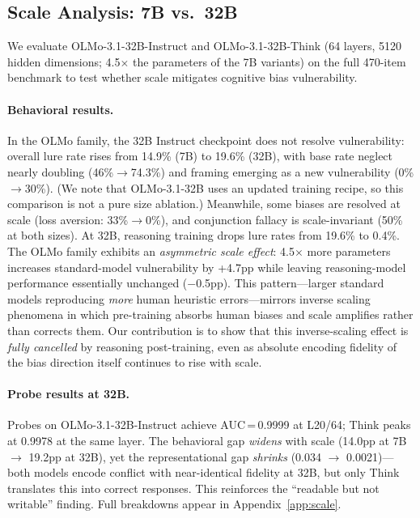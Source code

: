 \documentclass{article}
\begin{document}
\subsection{Scale Analysis: 7B vs.\ 32B}
\label{sec:scale}

We evaluate OLMo-3.1-32B-Instruct and OLMo-3.1-32B-Think
(64 layers, 5120 hidden dimensions; 4.5$\times$ the parameters of the
7B variants) on the full 470-item benchmark to test whether scale
mitigates cognitive bias vulnerability.

\paragraph{Behavioral results.}
In the OLMo family, the 32B Instruct checkpoint does not resolve vulnerability: overall lure rate rises from 14.9\% (7B) to 19.6\% (32B), with base rate neglect nearly doubling (46\%$\to$74.3\%) and framing emerging as a new vulnerability (0\%$\to$30\%).  (We note that OLMo-3.1-32B uses an updated training recipe, so this comparison is not a pure size ablation.)  Meanwhile, some biases are resolved at scale (loss aversion: 33\%$\to$0\%), and conjunction fallacy is scale-invariant (50\% at both sizes).
At 32B, reasoning training drops lure rates from 19.6\% to 0.4\%.  The OLMo family exhibits an \emph{asymmetric scale effect}: 4.5$\times$ more parameters increases standard-model vulnerability by +4.7pp while leaving reasoning-model performance essentially unchanged ($-$0.5pp).  This pattern---larger standard models reproducing \emph{more} human heuristic errors---mirrors inverse scaling phenomena \citep{mckenzie2023inverse, perez2023discovering} in which pre-training absorbs human biases and scale amplifies rather than corrects them.  Our contribution is to show that this inverse-scaling effect is \emph{fully cancelled} by reasoning post-training, even as absolute encoding fidelity of the bias direction itself continues to rise with scale.

\paragraph{Probe results at 32B.}
Probes on OLMo-3.1-32B-Instruct achieve AUC\,=\,0.9999 at L20/64; Think peaks at 0.9978 at the same layer.  The behavioral gap \emph{widens} with scale (14.0pp at 7B $\to$ 19.2pp at 32B), yet the representational gap \emph{shrinks} (0.034 $\to$ 0.0021)---both models encode conflict with near-identical fidelity at 32B, but only Think translates this into correct responses.  This reinforces the ``readable but not writable'' finding.  Full breakdowns appear in Appendix~\ref{app:scale}.
\end{document}

